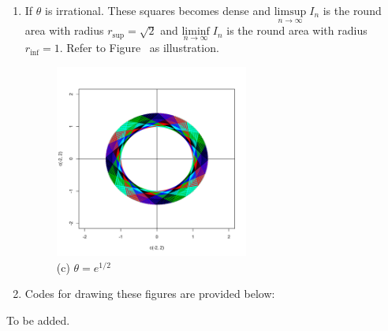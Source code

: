 \begin{list}{1.9.}{}
\begin{enumerate}
  \item If $\theta$ is irrational. These squares becomes dense and $ \underset{n\to\infty}{\mathrm{limsup}}\;I_n$ is the round area with radius $r_{\mathrm{sup}}= \sqrt{2}$ and $ \underset{n\to\infty}{\mathrm{liminf}}\;I_n$ is the round area with radius $r_{\mathrm{inf}} = 1$. Refer to Figure~ as illustration.
    \begin{figure}[htbp]
      \centering
      \includegraphics[width=0.6\textwidth]{./Figures/1_9_7_c.pdf}
      \caption{(c) $\theta = e^{1/2}$}
      \label{fig:1.9.7.c}
    \end{figure}
  \item Codes for drawing these figures are provided below:
    
  \end{enumerate}

  
\item To be added.

  
\end{list}

